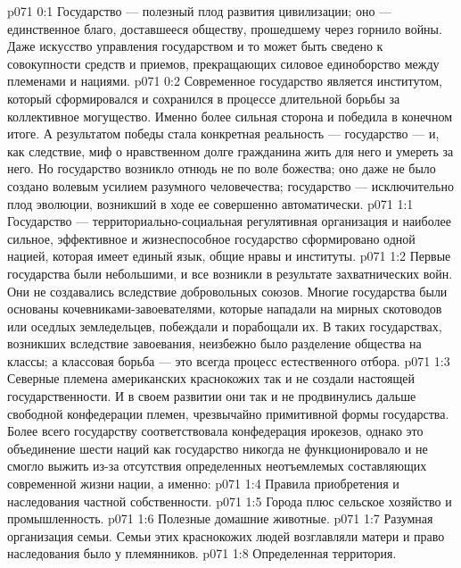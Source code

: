 \author{Мелхиседек}
\vs p071 0:1 Государство --- полезный плод развития цивилизации; оно --- единственное благо, доставшееся обществу, прошедшему через горнило войны. Даже искусство управления государством и то может быть сведено к совокупности средств и приемов, прекращающих силовое единоборство между племенами и нациями.
\vs p071 0:2 Современное государство является институтом, который сформировался и сохранился в процессе длительной борьбы за коллективное могущество. Именно более сильная сторона и победила в конечном итоге. А результатом победы стала конкретная реальность --- государство --- и, как следствие, миф о нравственном долге гражданина жить для него и умереть за него. Но государство возникло отнюдь не по воле божества; оно даже не было создано волевым усилием разумного человечества; государство --- исключительно плод эволюции, возникший в ходе ее совершенно автоматически.
\vs p071 1:1 Государство --- территориально\hyp{}социальная регулятивная организация и наиболее сильное, эффективное и жизнеспособное государство сформировано одной нацией, которая имеет единый язык, общие нравы и институты.
\vs p071 1:2 Первые государства были небольшими, и все возникли в результате захватнических войн. Они не создавались вследствие добровольных союзов. Многие государства были основаны кочевниками\hyp{}завоевателями, которые нападали на мирных скотоводов или оседлых земледельцев, побеждали и порабощали их. В таких государствах, возникших вследствие завоевания, неизбежно было разделение общества на классы; а классовая борьба --- это всегда процесс естественного отбора.
\vs p071 1:3 \pc Северные племена американских краснокожих так и не создали настоящей государственности. И в своем развитии они так и не продвинулись дальше свободной конфедерации племен, чрезвычайно примитивной формы государства. Более всего государству соответствовала конфедерация ирокезов, однако это объединение шести наций как государство никогда не функционировало и не смогло выжить из\hyp{}за отсутствия определенных неотъемлемых составляющих современной жизни нации, а именно:
\vs p071 1:4 \bibnobreakspace Правила приобретения и наследования частной собственности.
\vs p071 1:5 \bibnobreakspace Города плюс сельское хозяйство и промышленность.
\vs p071 1:6 \bibnobreakspace Полезные домашние животные.
\vs p071 1:7 \bibnobreakspace Разумная организация семьи. Семьи этих краснокожих людей возглавляли матери и право наследования было у племянников.
\vs p071 1:8 \bibnobreakspace Определенная территория.
